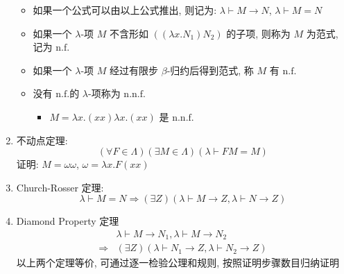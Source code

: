 \documentclass[11pt,a4paper,twocolumn,fleqn]{article} %
\newcommand\nf{\ensuremath{\mathrm{n.f.}}}
\newcommand\nnf{\ensuremath{\mathrm{n.n.f.}}}
\begin{document}
\begin{enumerate}
\begin{enumerate}
	\end{enumerate}
	\begin{itemize}
		\item 如果一个公式可以由以上公式推出, 则记为: $\lambda\vdash M\to N$, 
		$\lambda \vdash M=N$
		\item 如果一个 $\lambda$-项 $M$ 不含形如 $((\lambda x.N_1)N_2)$ 的子项, 
		则称为 $M$ 为范式, 记为 \nf
		\item 如果一个 $\lambda$-项 $M$ 经过有限步 $\beta$-归约后得到范式, 
		称 $M$ 有 \nf
		\item 没有 \nf 的 $\lambda$-项称为 \nnf
		\begin{itemize}
			\item $M = \lambda x.(xx)\lambda x. (xx)$ 是 \nnf
		\end{itemize}
	\end{itemize}
	\item 不动点定理:
	$$
	 	(\forall F\in \Lambda)(\exists M\in \Lambda) (\lambda\vdash FM=M)
	$$
	证明: $M = \omega\omega$, $\omega = \lambda x. F(xx)$
	\item Church-Rosser 定理: 
	$$
		\lambda \vdash M=N \Rightarrow (\exists Z)
		(\lambda \vdash M\to Z, \lambda\vdash N\to Z)
	$$
	\item Diamond Property 定理
	\begin{align*}
		&\lambda \vdash M\to N_1, \lambda \vdash M \to N_2 \\\Rightarrow &
		(\exists Z)(\lambda \vdash N_1\to Z, \lambda \vdash N_2 \to Z)
	\end{align*}
	以上两个定理等价, 可通过逐一检验公理和规则, 按照证明步骤数目归纳证明
\end{enumerate}
\end{document}
